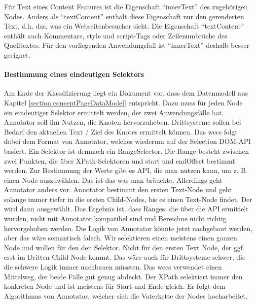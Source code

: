     Für Text eines Content Features ist die Eigenschaft "`innerText"' des zugehörigen Nodes.
    Anders als "`textContent"' enthält diese Eigenschaft nur den gerenderten Text, d.h. das, was ein Webseitenbesucher sieht.
    Die Eigenschaft "`textContent"' enthält auch Kommentare, style und script-Tags oder Zeilenumbrüche des Quelltextes.
    Für den vorliegenden Anwendungsfall ist "`innerText"' deshalb besser geeignet.

    \paragraph{Bestimmung eines eindeutigen Selektors}
    Am Ende der Klassifizierung liegt ein Dokument vor, dass dem Datenmodell aus Kapitel \ref{section:conceptPageDataModel} entspricht.
    Dazu muss für jeden Node ein eindeutiger Selektor ermittelt werden,
    der zwei Anwendungsfälle hat.
    Annotator soll ihn Nutzen, die Knoten hervorzuheben.
    Drittsysteme sollen bei Bedarf den aktuellen Text / Ziel des Knotes ermittelt können.
    Das \gls{wccs} folgt dabei dem Format von Annotator, welches wiederum auf der Selection DOM-API basiert.
    Ein Selektor ist demnach ein RangeSelector.
    Die Range besteht zwischen zwei Punkten,
    die über XPath-Selektoren und start und endOffset bestimmt werden.
    Zur Bestimmung der Werte gibt es API, die man nutzen kann, um z. B. einen Node auszuwählen.
    Das ist das was man bräuchte.
    Allerdings geht Annotator anders vor.
    Annotator bestimmt den ersten Text-Node und geht solange immer tiefer
    in die ersten Child-Nodes, bis es einen Text-Node findet.
    Der wird dann ausgewählt.
    Das Ergebnis ist, dass Ranges, die über die API ermittelt wurden,
    nicht mit Annotator kompatibel sind und Bereichne nicht richtig hervorgehoben werden.
    Die Logik von Annotator könnte jetzt nachgebaut werden, aber das wäre semantisch falsch.
    Wir selektieren einen meistens einen ganzen Node und wollen für den den Selektor.
    Nicht für den ersten Text Node, der ggf. erst im Dritten Child Node kommt.
    Das wäre auch für Drittsysteme schwer, die die schwere Logik immer nachbauen müssten.
    Das \gls{wccs} verwendet einen Mittelweg, der beide Fälle gut genug abdeckt.
    Der XPath selektiert immer den konkreten Node und ist meistens für Start und Ende gleich.
    Er folgt dem Algorithmus von Annotator, welcher sich die Vaterkette der Nodes hocharbeitet,
